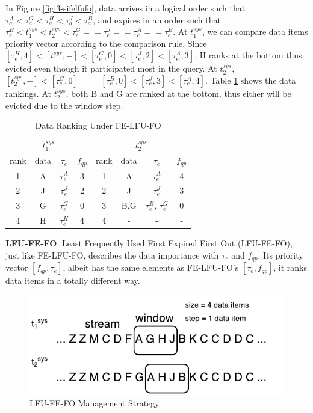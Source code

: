 In Figure \ref{fig:3-sifelfufo}, data arrives in a logical order such that $\tau^{A}_{a} < \tau^{G}_{a} < \tau^{H}_{a} < \tau^{J}_{a} < \tau^{B}_{a}$, and expires in an order such that $\tau^{H}_{e} < t^{sys}_{1} < t^{sys}_{2} < \tau^{G}_{e} == \tau^{J}_{e} == \tau^{A}_{e} == \tau^{B}_{e}$.
At $t^{sys}_{1}$, we can compare data items priority vector according to the comparison rule. 
Since $[\tau^{H}_{e}, 4] < [t^{sys}_{1}, -] < [\tau^{G}_{e}, 0] < [\tau^{J}_{e}, 2] < [\tau^{A}_{e}, 3]$, H ranks at the bottom thus evicted even though it participated most in the query. 
At $t^{sys}_{2}$, $[t^{sys}_{2}, -] < [\tau^{G}_{e}, 0] == [\tau^{B}_{e}, 0] < [\tau^{J}_{e}, 3] < [\tau^{A}_{e}, 4]$.
Table \ref{tab:felfufo} shows the data rankings. 
At $t^{sys}_{2}$, both B and G are ranked at the bottom, thus either will be evicted due to the window step. 

\begin{table}[!htbp]
\centering
\caption{Data Ranking Under FE-LFU-FO}
\label{tab:felfufo}
\begin{tabular}{|c|c|c|c||c|c|c|c|}
\hline
\multicolumn{4}{|c||}{$t^{sys}_{1}$} & \multicolumn{4}{c|}{$t^{sys}_{2}$} \\ \hhline{|========|}
rank & data & $\tau_{e}$ & $f_{qp}$ & rank & data & $\tau_{e}$ & $f_{qp}$ \\ \hhline{|=|=|=|=#=|=|=|=|}
1 & A & $\tau^{A}_{e}$ & 3 & 1 & A & $\tau^{A}_{e}$ & 4 \\ \hline
2 & J & $\tau^{J}_{e}$ & 2 & 2 & J & $\tau^{J}_{e}$ & 3 \\ \hline
3 & G & $\tau^{G}_{e}$ & 0 & 3 & B,G & $\tau^{B}_{e}$, $\tau^{G}_{e}$ & 0 \\ \hline
4 & H & $\tau^{H}_{e}$ & 4 & 4 & - & - & - \\ \hline
\end{tabular}
\end{table}

\textbf{LFU-FE-FO}:
Least Frequently Used First Expired First Out (LFU-FE-FO), just like FE-LFU-FO, describes the data importance with $\tau_{e}$ and $f_{qp}$. 
Its priority vector $[f_{qp}, \tau_{e}]$, albeit has the same elements as FE-LFU-FO's $[\tau_{e}, f_{qp}]$, it ranks data items in a totally different way. 

\begin{figure}[!htbp]
	\centering
    \includegraphics[width=5in]{img/3-silfufefo.pdf}
    \caption{LFU-FE-FO Management Strategy}
    \label{fig:3-silfufefo}
\end{figure}

